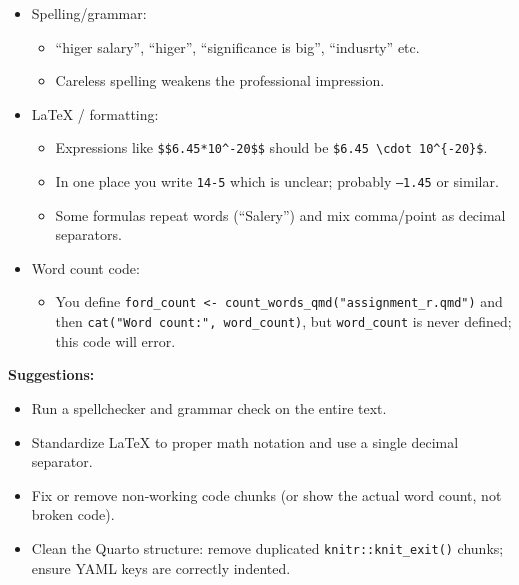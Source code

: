 \documentclass[
  letterpaper,
  DIV=11,
  numbers=noendperiod]{scrartcl}
\providecommand{\tightlist}{%
  \setlength{\itemsep}{0pt}\setlength{\parskip}{0pt}}
\begin{document}
\begin{itemize}
\tightlist
\item
  Spelling/grammar:

  \begin{itemize}
  \tightlist
  \item
    ``higer salary'', ``higer'', ``significance is big'', ``indusrty''
    etc.\\
  \item
    Careless spelling weakens the professional impression.
  \end{itemize}
\item
  LaTeX / formatting:

  \begin{itemize}
  \tightlist
  \item
    Expressions like \texttt{\$\$6.45*10\^{}-20\$\$} should be
    \texttt{\$6.45\ \textbackslash{}cdot\ 10\^{}\{-20\}\$}.\\
  \item
    In one place you write \texttt{14-5} which is unclear; probably
    \texttt{–1.45} or similar.\\
  \item
    Some formulas repeat words (``Salery'') and mix comma/point as
    decimal separators.
  \end{itemize}
\item
  Word count code:

  \begin{itemize}
  \tightlist
  \item
    You define
    \texttt{ford\_count\ \textless{}-\ count\_words\_qmd("assignment\_r.qmd")}
    and then \texttt{cat("Word\ count:",\ word\_count)}, but
    \texttt{word\_count} is never defined; this code will error.
  \end{itemize}
\end{itemize}

\textbf{Suggestions:}

\begin{itemize}
\tightlist
\item
  Run a spellchecker and grammar check on the entire text.\\
\item
  Standardize LaTeX to proper math notation and use a single decimal
  separator.\\
\item
  Fix or remove non‑working code chunks (or show the actual word count,
  not broken code).\\
\item
  Clean the Quarto structure: remove duplicated
  \texttt{knitr::knit\_exit()} chunks; ensure YAML keys are correctly
  indented.
\end{itemize}
\end{document}
